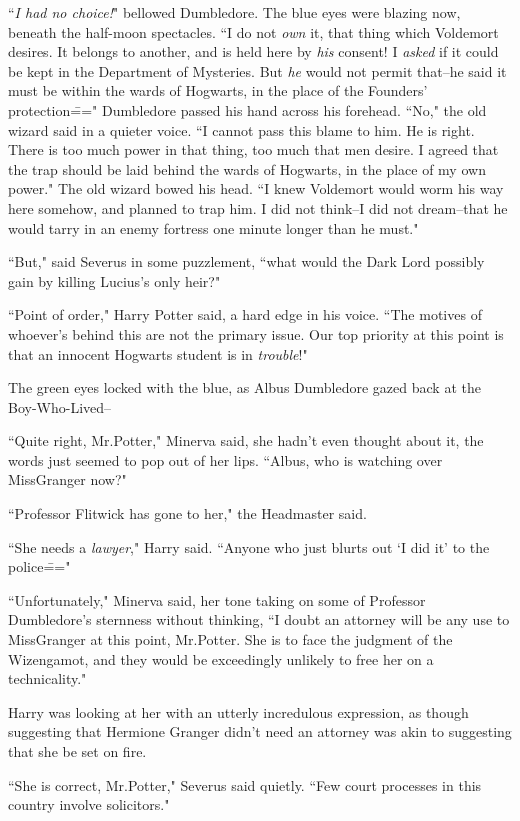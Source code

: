 ``\emph{I had no choice!}" bellowed Dumbledore. The blue eyes were blazing now, beneath the half-moon spectacles. ``I do not \emph{own} it, that thing which Voldemort desires. It belongs to another, and is held here by \emph{his} consent! I \emph{asked} if it could be kept in the Department of Mysteries. But \emph{he} would not permit that\---he said it must be within the wards of Hogwarts, in the place of the Founders' protection\===" Dumbledore passed his hand across his forehead. ``No," the old wizard said in a quieter voice. ``I cannot pass this blame to him. He is right. There is too much power in that thing, too much that men desire. I agreed that the trap should be laid behind the wards of Hogwarts, in the place of my own power." The old wizard bowed his head. ``I knew Voldemort would worm his way here somehow, and planned to trap him. I did not think\---I did not dream\---that he would tarry in an enemy fortress one minute longer than he must."

``But," said Severus in some puzzlement, ``what would the Dark Lord possibly gain by killing Lucius's only heir?"

``Point of order," Harry Potter said, a hard edge in his voice. ``The motives of whoever's behind this are not the primary issue. Our top priority at this point is that an innocent Hogwarts student is in \emph{trouble}!"

The green eyes locked with the blue, as Albus Dumbledore gazed back at the Boy-Who-Lived\---

``Quite right, Mr.\?Potter," Minerva said, she hadn't even thought about it, the words just seemed to pop out of her lips. ``Albus, who is watching over Miss\?Granger now?"

``Professor Flitwick has gone to her," the Headmaster said.

``She needs a \emph{lawyer}," Harry said. ``Anyone who just blurts out `I did it' to the police\==="

``Unfortunately," Minerva said, her tone taking on some of Professor Dumbledore's sternness without thinking, ``I doubt an attorney will be any use to Miss\?Granger at this point, Mr.\?Potter. She is to face the judgment of the Wizengamot, and they would be exceedingly unlikely to free her on a technicality."

Harry was looking at her with an utterly incredulous expression, as though suggesting that Hermione Granger didn't need an attorney was akin to suggesting that she be set on fire.

``She is correct, Mr.\?Potter," Severus said quietly. ``Few court processes in this country involve solicitors."

